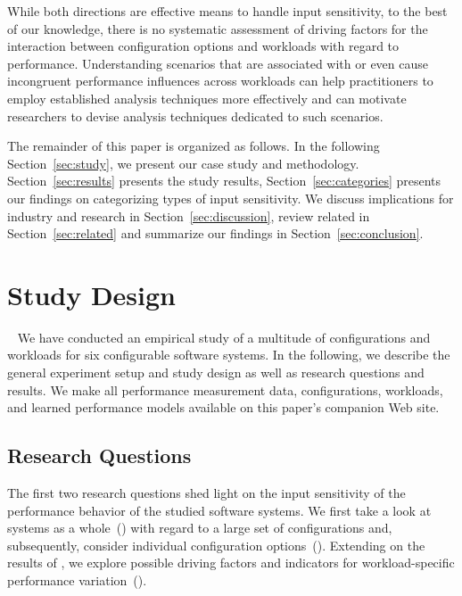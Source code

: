 While both directions are effective means to handle input sensitivity, to the best of our knowledge, there is no systematic assessment of driving factors for the interaction between configuration options and workloads with regard to performance. Understanding scenarios that are associated with or even cause incongruent performance influences across workloads can help practitioners to employ established analysis techniques more effectively and can motivate researchers to devise analysis techniques dedicated to such scenarios.

The remainder of this paper is organized as follows. In the following Section~\ref{sec:study}, we present our case study and methodology. Section~\ref{sec:results} presents the study results, Section~\ref{sec:categories} presents our findings on categorizing types of input sensitivity. We discuss implications for industry and research in Section~\ref{sec:discussion}, review related in Section~\ref{sec:related} and summarize our findings in Section~\ref{sec:conclusion}.

\section{Study Design}~\label{sec:study}
We have conducted an empirical study of a multitude of configurations and workloads for six configurable software systems. In the following, we describe the general experiment setup and study design as well as research questions and results. We make all performance measurement data, configurations, workloads, and learned performance models available on this paper's companion Web site.

\subsection{Research Questions}
The first two research questions shed light on the input sensitivity of the performance behavior of the studied software systems. We first take a look at systems as a whole~() with regard to a large set of configurations and, subsequently, consider individual configuration options~(). Extending on the results of , we explore possible driving factors and indicators for workload-specific performance variation~().

